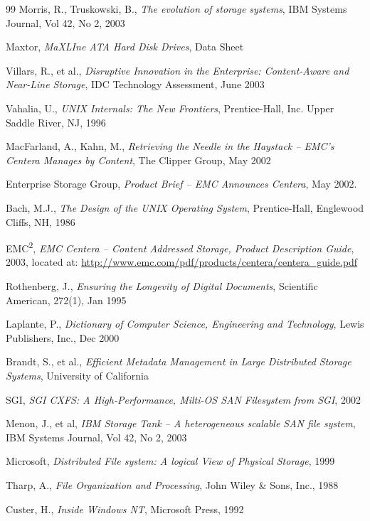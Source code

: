 \begin{thebibliography}{99}
 Morris, R., Truskowski, B., \emph{The evolution of storage systems},
  IBM Systems Journal, Vol 42, No 2, 2003

 Maxtor, \emph{MaXLIne ATA Hard Disk Drives}, Data Sheet

 Villars, R., et al., \emph{Disruptive Innovation in the Enterprise:
  Content-Aware and Near-Line Storage}, IDC Technology Assessment, June
  2003

 Vahalia, U., \emph{UNIX Internals: The New Frontiers}, Prentice-Hall,
  Inc. Upper Saddle River, NJ, 1996

 MacFarland, A., Kahn, M., \emph{Retrieving the Needle in the Haystack
  -- EMC's Centera Manages by Content}, The Clipper Group, May 2002

 Enterprise Storage Group, \emph{Product Brief -- EMC Announces
  Centera}, May 2002.

 Bach, M.J., \emph{The Design of the UNIX Operating System},
  Prentice-Hall, Englewood Cliffs, NH, 1986

 EMC\textsuperscript{2}, \emph{EMC Centera -- Content Addressed
  Storage, Product Description Guide}, 2003, located at:
  \url{http://www.emc.com/pdf/products/centera/centera_guide.pdf}

 Rothenberg, J., \emph{Ensuring the Longevity of Digital Documents},
  Scientific American, 272(1), Jan 1995

 Laplante, P., \emph{Dictionary of Computer Science, Engineering and
  Technology}, Lewis Publishers, Inc., Dec 2000

 Brandt, S., et al., \emph{Efficient Metadata Management in Large
  Distributed Storage Systems}, University of California

 SGI, \emph{SGI CXFS: A High-Performance, Milti-OS SAN Filesystem from
  SGI}, 2002

 Menon, J., et al, \emph{IBM Storage Tank -- A heterogeneous scalable
  SAN file system}, IBM Systems Journal, Vol 42, No 2, 2003

 Microsoft, \emph{Distributed File system: A logical View of Physical
  Storage}, 1999

 Tharp, A., \emph{File Organization and Processing}, John Wiley \&
  Sons, Inc., 1988

 Custer, H., \emph{Inside Windows NT}, Microsoft Press, 1992

\end{thebibliography}
